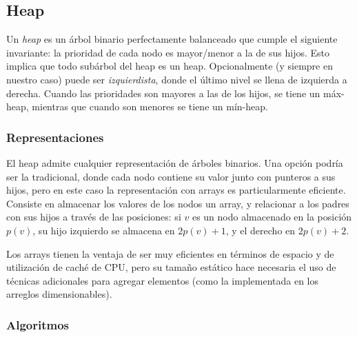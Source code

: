 \documentclass{article}
\begin{document}
\subsection{Heap}

Un \textit{heap} es un árbol binario perfectamente balanceado que cumple el siguiente invariante: la prioridad de cada nodo es mayor/menor a la de sus hijos. Esto implica que todo subárbol del heap es un heap. Opcionalmente (y siempre en nuestro caso) puede ser \textit{izquierdista}, donde el último nivel se llena de izquierda a derecha. Cuando las prioridades son mayores a las de los hijos, se tiene un máx-heap, mientras que cuando son menores se tiene un mín-heap.

\subsubsection{Representaciones}

El heap admite cualquier representación de árboles binarios. Una opción podría ser la tradicional, donde cada nodo contiene su valor junto con punteros a sus hijos, pero en este caso la representación con arrays es particularmente eficiente. Consiste en almacenar los valores de los nodos un array, y relacionar a los padres con sus hijos a través de las posiciones: si $v$ es un nodo almacenado en la posición $p(v)$, su hijo izquierdo se almacena en $2p(v) + 1$, y el derecho en $2p(v) + 2$.

Los arrays tienen la ventaja de ser muy eficientes en términos de espacio y de utilización de caché de CPU, pero su tamaño estático hace necesaria el uso de técnicas adicionales para agregar elementos (como la implementada en los arreglos dimensionables).

\subsubsection{Algoritmos}
\end{document}

